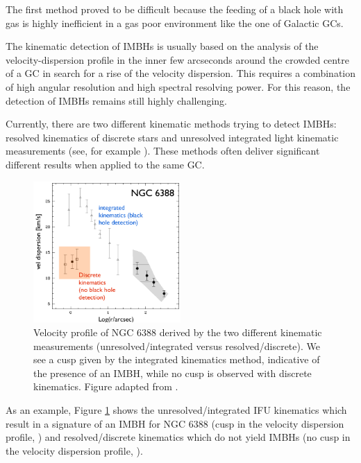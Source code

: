 The first method proved to be difficult because the feeding of a black hole with gas is highly inefficient in a gas poor environment like the one of Galactic \acp{GC}. 
\par The kinematic detection of \acp{IMBH} is usually based on the analysis of the velocity-dispersion profile in the inner few arcseconds around the crowded centre of a \ac{GC} in search for a rise of the velocity dispersion. This requires a combination of high angular resolution and high spectral resolving power. For this reason, the detection of \acp{IMBH} remains still highly challenging. 
\par Currently, there are two different kinematic methods trying to detect \acp{IMBH}: resolved kinematics of discrete stars and unresolved integrated light kinematic measurements (see, for example \citealp{2015MNRAS.453..365B}). These methods often deliver significant different results when applied to the same \ac{GC}.
\begin{figure}[htbp]
\centering
\includegraphics[width=0.5\textwidth]{Plots/Paolo_talk_plot.png}
\caption{Velocity profile of NGC 6388 derived by the two different kinematic measurements (unresolved/integrated versus resolved/discrete). We see a cusp given by the integrated kinematics method, indicative of the presence of an \ac{IMBH}, while no cusp is observed with discrete kinematics. Figure adapted from \citet{2013ApJ...769..107L}.}
\label{fig:NGC6388}
\end{figure}
As an example, Figure \ref{fig:NGC6388} shows the unresolved/integrated IFU kinematics which result in a signature of an \ac{IMBH} for NGC 6388 (cusp in the velocity dispersion profile, \citealp{2011A&A...533A..36L}) and resolved/discrete kinematics which do not yield \acp{IMBH} (no cusp in the velocity dispersion profile, \citealp{2013ApJ...769..107L}). 


